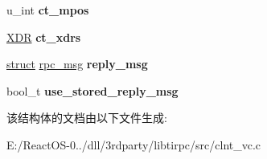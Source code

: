 \begin{DoxyCompactItemize}
\begin{tabbing}
\end{tabbing}\item 
\mbox{\label{structct__data_adc7042083aa5aedd67de0dbd2ca33c10}} 
u\+\_\+int {\bfseries ct\+\_\+mpos}
\item 
\mbox{\label{structct__data_aeb8883036c30663aa6363c26ce77ff35}} 
\hyperlink{struct____rpc__xdr}{X\+DR} {\bfseries ct\+\_\+xdrs}
\item 
\mbox{\label{structct__data_ae4c2d4696a0215ac28967f4c95baeebf}} 
\hyperlink{interfacestruct}{struct} \hyperlink{structrpc__msg}{rpc\+\_\+msg} {\bfseries reply\+\_\+msg}
\item 
\mbox{\label{structct__data_a000cfd7809712e9a39bfaf67cf3167cd}} 
bool\+\_\+t {\bfseries use\+\_\+stored\+\_\+reply\+\_\+msg}
\end{DoxyCompactItemize}


该结构体的文档由以下文件生成\+:\begin{DoxyCompactItemize}
\item 
E\+:/\+React\+O\+S-\/0../dll/3rdparty/libtirpc/src/clnt\+\_\+vc.\+c\end{DoxyCompactItemize}
